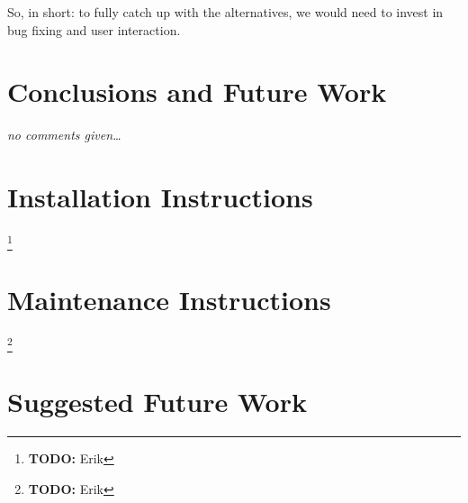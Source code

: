 \documentclass[11pt,a4paper]{report}
\newcommand{\hi}[1]{{\color{red}\em #1\/}\\}
\newcommand{\todo}[1]{\footnote{{\color{red} {\bf TODO:} #1}}}
\begin{document}
So, in short: to fully catch up with the alternatives, we would need to invest
in bug fixing and user interaction.

\chapter{Conclusions and Future Work}
\hi{no comments given\ldots}

\appendix
\chapter{Installation Instructions}
\todo{Erik}

\chapter{Maintenance Instructions}
\todo{Erik}

\chapter{Suggested Future Work}
\end{document}
